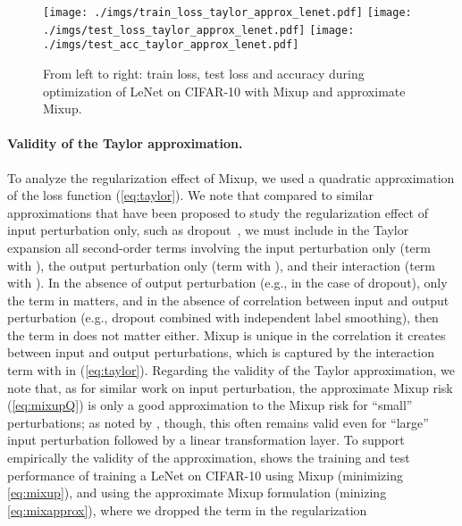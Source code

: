 \documentclass[twoside,11pt]{article}
\begin{document}
\begin{figure*}[ht]
\hfill
    \texttt{[image: ./imgs/train\_loss\_taylor\_approx\_lenet.pdf]}
    \endminipage\hfill
    \texttt{[image: ./imgs/test\_loss\_taylor\_approx\_lenet.pdf]}
    \endminipage\hfill 
    \texttt{[image: ./imgs/test\_acc\_taylor\_approx\_lenet.pdf]}
    \endminipage\hfill
    \caption{\small{From left to right: train loss, test loss and accuracy during optimization of 
    LeNet on CIFAR-10 with Mixup and approximate Mixup.}
    }\label{fig:mess_vs_approx_acc}
\end{figure*} 
\paragraph{Validity of the Taylor approximation.} 
To analyze the regularization effect of Mixup, we used a quadratic approximation of the loss 
function (\ref{eq:taylor}). We note that compared to similar approximations that have been proposed 
to study the regularization effect of input perturbation only, such as 
dropout~\citep{wager2013dropout,wei2020implicit}, we must include in the Taylor expansion all 
second-order terms involving the input perturbation only (term with ), 
the output perturbation only (term with ), and their interaction 
(term with ). In the absence of output perturbation (e.g., in the case of dropout), 
only the term in  matters, and in the absence of correlation between input and output 
perturbation (e.g., dropout combined with independent label smoothing), then the term in  
does not matter either. Mixup is unique in the correlation it creates between input and output perturbations, 
which is captured by the interaction term with  in (\ref{eq:taylor}). 
Regarding the validity of the Taylor approximation, we note that, as for similar work on input perturbation, 
the approximate Mixup risk (\ref{eq:mixupQ}) is only a good approximation to the Mixup risk for ``small'' 
perturbations; as noted by \citet[Annex A.2]{wei2020implicit}, though, this often remains valid even for ``large'' 
input perturbation followed by a linear transformation layer. 
To support empirically the validity of the 
approximation,  shows the training and test 
performance of training a LeNet on CIFAR-10 using
Mixup (minimizing \eqref{eq:mixup}), and using the approximate Mixup formulation (minizing \eqref{eq:mixapprox}), 
where we dropped the term  in the regularization 
\end{document}
